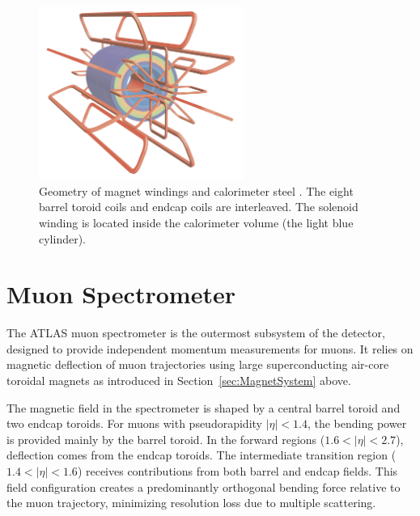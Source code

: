 \begin{figure}[htbp]
  \centering
  \includegraphics[width=0.6\textwidth]{figs/chapter2/magnet_windings.png}
  \caption{Geometry of magnet windings and calorimeter steel \cite{ATLASDetector2008}. The eight barrel toroid coils and endcap coils are interleaved. The solenoid winding is located inside the calorimeter volume (the light blue cylinder).}
  \label{fig:magnet_windings}
\end{figure}

\section{Muon Spectrometer} \label{sec:MuonSpectrometer}
The ATLAS muon spectrometer is the outermost subsystem of the detector, designed to provide independent momentum measurements for muons. It relies on magnetic deflection of muon trajectories using large superconducting air-core toroidal magnets as introduced in Section~\ref{sec:MagnetSystem} above.

The magnetic field in the spectrometer is shaped by a central barrel toroid and two endcap toroids. For muons with pseudorapidity $|\eta| < 1.4$, the bending power is provided mainly by the barrel toroid. In the forward regions ($1.6 < |\eta| < 2.7$), deflection comes from the endcap toroids. The intermediate transition region ($1.4 < |\eta| < 1.6$) receives contributions from both barrel and endcap fields. This field configuration creates a predominantly orthogonal bending force relative to the muon trajectory, minimizing resolution loss due to multiple scattering. 


